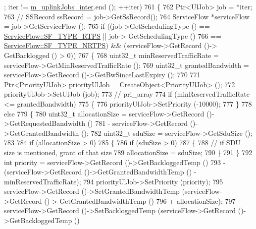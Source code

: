\begin{DoxyCode}
      ; iter != \hyperlink{classns3_1_1UplinkSchedulerMBQoS_a70eef7c9cb6dad5e71a2105e07d1ec69}{m\_uplinkJobs\_inter}.end (); ++iter)
761     \{
762       Ptr<UlJob> job = *iter;
763       \textcolor{comment}{// SSRecord ssRecord = job->GetSsRecord();}
764       ServiceFlow *serviceFlow = job->GetServiceFlow ();
765       \textcolor{keywordflow}{if} ((job->GetSchedulingType () == \hyperlink{classns3_1_1ServiceFlow_a7990ba10be1e098328fd1e6382a26235a0e98ff713b932a029acad7e5b24bbf55}{ServiceFlow::SF\_TYPE\_RTPS} || job->
      GetSchedulingType ()
766            == \hyperlink{classns3_1_1ServiceFlow_a7990ba10be1e098328fd1e6382a26235a7f8577f851a9f01d159442a3a3fcdf48}{ServiceFlow::SF\_TYPE\_NRTPS}) && (serviceFlow->GetRecord ()->
      GetBacklogged () > 0))
767         \{
768           uint32\_t minReservedTrafficRate = serviceFlow->GetMinReservedTrafficRate ();
769           uint32\_t grantedBandwidth = serviceFlow->GetRecord ()->GetBwSinceLastExpiry ();
770 
771           Ptr<PriorityUlJob> priorityUlJob = CreateObject<PriorityUlJob> ();
772           priorityUlJob->SetUlJob (job);
773           \textcolor{comment}{// pri\_array}
774           \textcolor{keywordflow}{if} (minReservedTrafficRate <= grantedBandwidth)
775             \{
776               priorityUlJob->SetPriority (-10000);
777             \}
778           \textcolor{keywordflow}{else}
779             \{
780               uint32\_t allocationSize = serviceFlow->GetRecord ()->GetRequestedBandwidth ()
781                 - serviceFlow->GetRecord ()->GetGrantedBandwidth ();
782               uint32\_t sduSize = serviceFlow->GetSduSize ();
783 
784               \textcolor{keywordflow}{if} (allocationSize > 0)
785                 \{
786                   \textcolor{keywordflow}{if} (sduSize > 0)
787                     \{
788                       \textcolor{comment}{// if SDU size is mentioned, grant of that size}
789                       allocationSize = sduSize;
790                     \}
791                 \}
792               \textcolor{keywordtype}{int} priority = serviceFlow->GetRecord ()->GetBackloggedTemp ()
793                 - (serviceFlow->GetRecord ()->GetGrantedBandwidthTemp () - minReservedTrafficRate);
794               priorityUlJob->SetPriority (priority);
795               serviceFlow->GetRecord ()->SetGrantedBandwidthTemp (serviceFlow->GetRecord ()->
      GetGrantedBandwidthTemp ()
796                                                                   + allocationSize);
797               serviceFlow->GetRecord ()->SetBackloggedTemp (serviceFlow->GetRecord ()->GetBackloggedTemp ()

\end{DoxyCode}

